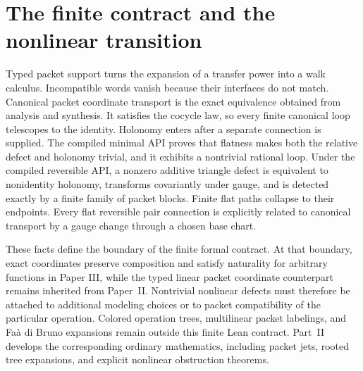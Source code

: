 \section{The finite contract and the nonlinear transition}

Typed packet support turns the expansion of a transfer power into a walk
calculus.  Incompatible words vanish because their interfaces do not match.
Canonical packet coordinate transport is the exact equivalence obtained
from analysis and synthesis.  It satisfies the cocycle law, so every finite
canonical loop telescopes to the identity.  Holonomy enters after a separate
connection is supplied.  The compiled minimal API proves that flatness makes
both the relative defect and holonomy trivial, and it exhibits a nontrivial
rational loop.  Under the compiled reversible API, a nonzero additive triangle
defect is equivalent to nonidentity holonomy, transforms covariantly under
gauge, and is detected exactly by a finite family of packet blocks.  Finite
flat paths collapse to their endpoints.  Every flat reversible pair connection
is explicitly related to canonical transport by a gauge change through a
chosen base chart.

These facts define the boundary of the finite formal contract.  At that
boundary, exact coordinates preserve composition and satisfy naturality for
arbitrary functions in Paper III, while the typed linear packet coordinate
counterpart remains inherited from Paper~II.  Nontrivial nonlinear defects
must therefore be attached to additional modeling choices or to
packet compatibility of the particular operation.  Colored operation trees,
multilinear packet labelings, and Fa\`a di Bruno expansions remain
outside this finite Lean contract. Part~II develops the corresponding ordinary mathematics, including packet jets, rooted tree expansions, and explicit nonlinear obstruction theorems.


\clearpage
